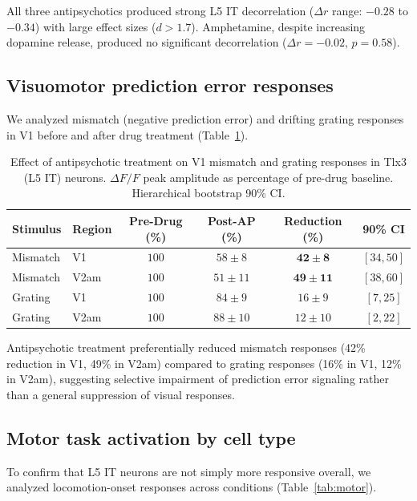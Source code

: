 \documentclass[11pt]{article}
\begin{document}
All three antipsychotics produced strong L5 IT decorrelation ($\Delta r$ range: $-0.28$ to $-0.34$) with large effect sizes ($d > 1.7$). Amphetamine, despite increasing dopamine release, produced no significant decorrelation ($\Delta r = -0.02$, $p = 0.58$).

\subsection{Visuomotor prediction error responses}

We analyzed mismatch (negative prediction error) and drifting grating responses in V1 before and after drug treatment (Table~\ref{tab:pe}).

\begin{table}[H]
\centering
\caption{Effect of antipsychotic treatment on V1 mismatch and grating responses in Tlx3 (L5 IT) neurons. $\Delta F/F$ peak amplitude as percentage of pre-drug baseline. Hierarchical bootstrap 90\% CI.}
\label{tab:pe}
\begin{tabular}{llcccc}
\toprule
\textbf{Stimulus} & \textbf{Region} & \textbf{Pre-Drug (\%)} & \textbf{Post-AP (\%)} & \textbf{Reduction (\%)} & \textbf{90\% CI} \\
\midrule
Mismatch & V1 & $100$ & $58 \pm 8$ & $\mathbf{42 \pm 8}$ & $[34, 50]$ \\
Mismatch & V2am & $100$ & $51 \pm 11$ & $\mathbf{49 \pm 11}$ & $[38, 60]$ \\
Grating & V1 & $100$ & $84 \pm 9$ & $16 \pm 9$ & $[7, 25]$ \\
Grating & V2am & $100$ & $88 \pm 10$ & $12 \pm 10$ & $[2, 22]$ \\
\bottomrule
\end{tabular}
\end{table}

Antipsychotic treatment preferentially reduced mismatch responses (42\% reduction in V1, 49\% in V2am) compared to grating responses (16\% in V1, 12\% in V2am), suggesting selective impairment of prediction error signaling rather than a general suppression of visual responses.

\subsection{Motor task activation by cell type}

To confirm that L5 IT neurons are not simply more responsive overall, we analyzed locomotion-onset responses across conditions (Table~\ref{tab:motor}).
\end{document}
